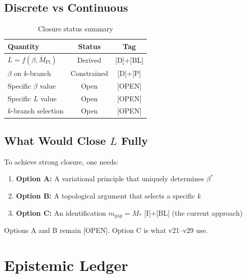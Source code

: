 \documentclass[11pt,a4paper]{article}
\begin{document}
\subsection{Discrete vs Continuous}

\begin{table}[h]
\centering
\caption{Closure status summary}
\label{tab:closure-status}
\begin{tabular}{lcc}
\toprule
Quantity & Status & Tag \\
\midrule
$L = f(\beta, \bar{M}_{\text{Pl}})$ & Derived & [D]+[BL] \\
$\beta$ on $k$-branch & Constrained & [D]+[P] \\
Specific $\beta$ value & Open & [OPEN] \\
Specific $L$ value & Open & [OPEN] \\
$k$-branch selection & Open & [OPEN] \\
\bottomrule
\end{tabular}
\end{table}

\subsection{What Would Close $L$ Fully}

To achieve strong closure, one needs:
\begin{enumerate}
  \item \textbf{Option A:} A variational principle that uniquely determines $\beta^*$
  \item \textbf{Option B:} A topological argument that selects a specific $k$
  \item \textbf{Option C:} An identification $m_{\text{gap}} = M_*$ [I]+[BL] (the current approach)
\end{enumerate}

Options A and B remain [OPEN]. Option C is what v21--v29 use.

\section{Epistemic Ledger}
\label{sec:ledger}
\end{document}
